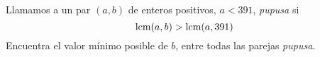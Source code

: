 Llamamos a un par $(a,b)$ de enteros positivos, $a<391$, \textit{pupusa} si
\[\textup{lcm}(a,b)>\textup{lcm}(a,391) \]
Encuentra el valor mínimo posible de $b$, entre todas las parejas \textit{pupusa}. \\\\
